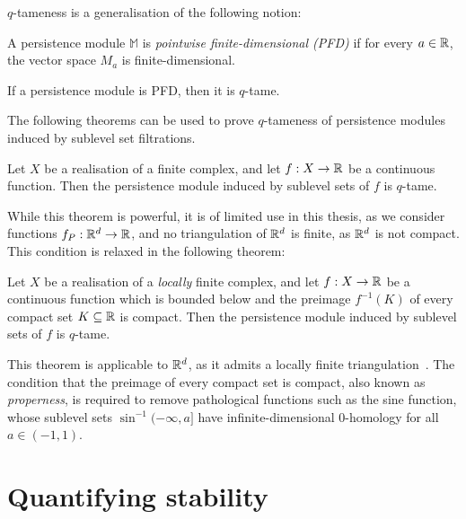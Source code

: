 $q$-tameness is a generalisation of the following notion:
\begin{definition}
    A persistence module $\mathbb{M}$ is \emph{pointwise finite-dimensional
    (PFD)} if for every $a \in \mathbb{R}$, the vector space $M_a$ is
    finite-dimensional.
\end{definition}
\begin{lemma}
    \label{lem:tameness_pfd}
    If a persistence module is PFD, then it is $q$-tame.
\end{lemma}

The following theorems can be used to prove $q$-tameness of persistence modules
induced by sublevel set filtrations.
\begin{theorem}
    Let $X$ be a realisation of a finite complex, and let $f : X \to \mathbb{R}$ be a
    continuous function. Then the persistence module induced by sublevel sets of
    $f$ is $q$-tame.
\end{theorem}
While this theorem is powerful, it is of limited use in this thesis, as we
consider functions $f_P : \mathbb{R}^d \to \mathbb{R}$, and no triangulation of $\mathbb{R}^d$ is
finite, as $\mathbb{R}^d$ is not compact. This condition is relaxed in the following
theorem:
\begin{theorem}
    \label{thm:tameness_condition}
    Let $X$ be a realisation of a \emph{locally} finite complex, and let
    $f : X \to \mathbb{R}$ be a continuous function which is bounded below and
    the preimage $f^{-1}(K)$ of every compact set $K \subseteq \mathbb{R}$ is compact.
    Then the persistence module induced by sublevel sets of $f$ is $q$-tame.
\end{theorem}
This theorem is applicable to $\mathbb{R}^d$, as it admits a locally finite
triangulation~\cite{grafakos2008classical}. The condition that the preimage of
every compact set is compact, also known as \emph{properness}, is required to
remove pathological functions such as the sine function, whose sublevel sets
$\sin^{-1}(-\infty, a]$ have infinite-dimensional $0$-homology for all
$a \in (-1, 1)$.

\section{Quantifying stability}

